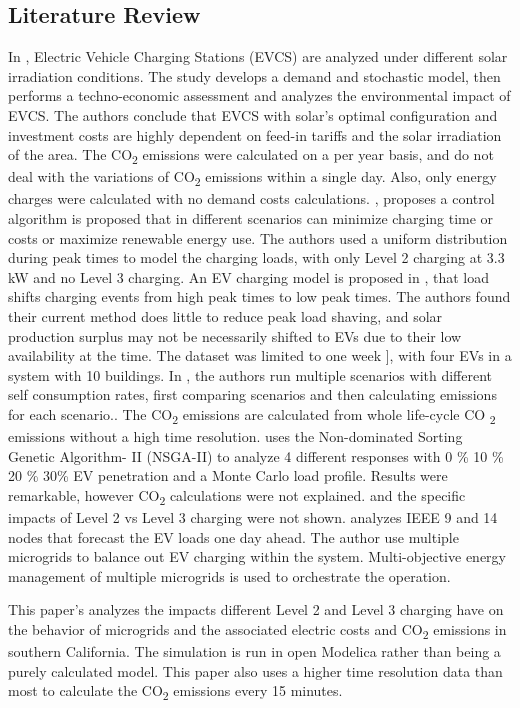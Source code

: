 \documentclass[conference]{IEEEtran}
\begin{document}
  	\subsection{Literature Review}
  		In  \cite{himabindu2021analysis},   Electric Vehicle Charging Stations (EVCS) are analyzed under different solar irradiation conditions.   The study develops a demand and stochastic model, then performs a techno-economic assessment and analyzes the environmental impact of EVCS.  The authors conclude that EVCS with solar's optimal configuration  and investment costs are highly dependent on feed-in tariffs and  the solar irradiation of the area. The  CO\textsubscript{2} emissions were calculated on a per year basis, and do not deal with the variations of  CO\textsubscript{2} emissions within a single day.  Also, only energy charges were calculated with no demand costs calculations. ,  proposes a control algorithm is proposed that in different scenarios can minimize charging time or costs or maximize renewable energy use. The authors used a uniform distribution during peak times  to model the charging loads, with only Level 2 charging at 3.3 kW and no Level 3 charging. An EV charging model is proposed in \cite{purvins2018electric},  that load shifts charging events from high peak times to low peak times.  The authors found their current method does little to reduce peak load shaving, and solar production surplus may not be necessarily shifted to EVs due to their low availability at the time.  The dataset was limited to one week ], with four EVs in a system with 10 buildings.  In \cite{Khemir}, the authors run multiple scenarios with different self consumption rates, first comparing scenarios and then calculating emissions for each scenario.. The CO\textsubscript{2} emissions are calculated from whole life-cycle CO \textsubscript{2}  emissions without a high time resolution.  \cite{huang2023multi} uses the Non-dominated Sorting Genetic Algorithm-
  		II (NSGA-II) to analyze 4 different responses with 0 \% 10 \% 20 \% 30\%  EV penetration and a Monte Carlo load profile.  Results were remarkable, however CO\textsubscript{2} calculations were not explained. and the specific impacts of  Level 2 vs Level 3 charging were not shown.  \cite{tan2020multi} analyzes IEEE  9 and 14 nodes  that forecast the EV loads one day ahead.  The author use multiple microgrids to balance out EV charging within the system.  Multi-objective energy management of multiple microgrids is used to orchestrate the operation.
  		
  		This paper's analyzes the impacts different Level 2 and Level 3 charging have on the behavior of microgrids and the associated electric costs and CO\textsubscript{2} emissions in southern California. The simulation is run in open Modelica rather than being a purely calculated model. This paper also uses a higher time resolution data than most to calculate the CO\textsubscript{2} emissions every 15 minutes.
\end{document}
